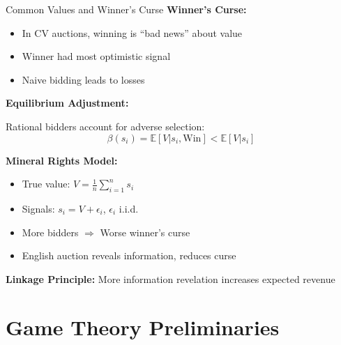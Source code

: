 \documentclass[xcolor={x11names}]{beamer}
\begin{document}
\begin{frame}{Common Values and Winner's Curse}
\textbf{Winner's Curse:}
\begin{itemize}
  \item In CV auctions, winning is ``bad news'' about value
  \item Winner had most optimistic signal
  \item Naive bidding leads to losses
\end{itemize}


\textbf{Equilibrium Adjustment:}

Rational bidders account for adverse selection:
\[\beta(s_i) = \mathbb{E}[V | s_i, \text{Win}] < \mathbb{E}[V | s_i]\]


\textbf{Mineral Rights Model:}
\begin{itemize}
  \item True value: $V = \frac{1}{n}\sum_{i=1}^n s_i$
  \item Signals: $s_i = V + \epsilon_i$, $\epsilon_i$ i.i.d.
  \item More bidders $\Rightarrow$ Worse winner's curse
  \item English auction reveals information, reduces curse
\end{itemize}

\textbf{Linkage Principle:}
More information revelation increases expected revenue
\end{frame}


\section{Game Theory Preliminaries}
\end{document}
